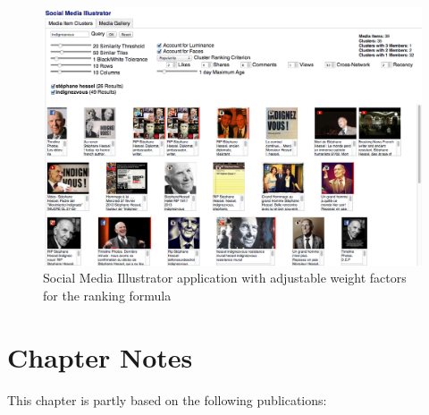 \begin{figure}[htb]
  \centering
  \includegraphics[width=1.0\linewidth]{social-media-illustrator.png}
  \caption[Social Media Illustrator application]
  {Social Media Illustrator application with adjustable weight factors
  for the ranking formula}
  \label{fig:social-media-illustrator}
\end{figure}


\section*{Chapter Notes}
This chapter is partly based on the following publications:



